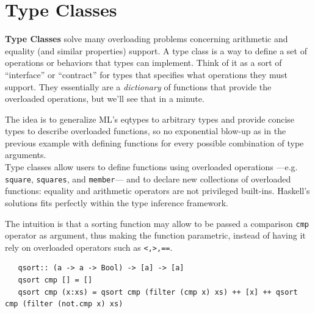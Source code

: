 \section{Type Classes}
\textbf{Type Classes} solve many overloading problems concerning arithmetic and equality (and similar properties) support.
A type class is a way to define a set of operations or behaviors that types can implement. Think of it as a sort of ``interface'' or ``contract'' for types that specifies what operations they must support.
They essentially are a \textit{dictionary} of functions that provide the overloaded operations, but we'll see that in a minute.

The idea is to generalize ML's eqtypes to arbitrary types
and provide concise types to describe overloaded
functions, so no exponential blow-up as in the previous example with defining functions for every possible combination of type arguments.\\
Type classes allow users to define functions using overloaded
operations ---e.g. \lstinline|square|, \lstinline|squares|, and \lstinline|member|--- and to
declare new collections of
overloaded functions: equality and arithmetic
operators are not privileged built-ins.
Haskell's solutions fits perfectly within the type inference framework.
\nl

The intuition is that a sorting function may allow to be passed a comparison \lstinline|cmp| operator as argument,
thus making the function parametric, instead of having it rely on overloaded operators such as \lstinline|<,>,==|.
\begin{lstlisting}
   qsort:: (a -> a -> Bool) -> [a] -> [a]
   qsort cmp [] = []
   qsort cmp (x:xs) = qsort cmp (filter (cmp x) xs) ++ [x] ++ qsort cmp (filter (not.cmp x) xs)
\end{lstlisting}

